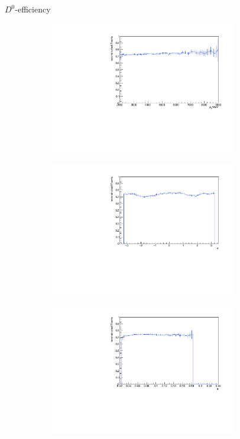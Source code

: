 \documentclass[11pt]{beamer}
\begin{document}
\begin{frame}{$D^0$-efficiency}
\begin{figure}
\begin{subfigure}{0.45\textwidth}
\includegraphics[width=0.9\textwidth]{up_pdf/single/neg/h_pt_reco_D0_neg.pdf}
\end{subfigure}
\begin{subfigure}{0.45\textwidth}
\includegraphics[width=0.9\textwidth]{up_pdf/single/neg/h_phi_reco_D0_neg.pdf}
\end{subfigure}
\begin{subfigure}{0.45\textwidth}
\includegraphics[width=0.9\textwidth]{up_pdf/single/neg/h_theta_reco_D0_neg.pdf}

\end{subfigure}
\end{figure}
\end{frame}
\end{document}
